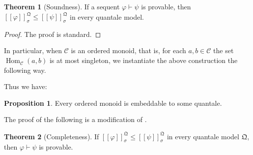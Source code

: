 \documentclass[8pt]{article}
\theoremstyle{definition}
\theoremstyle{definition}
\newtheorem{theorem}{Theorem}[section]
\theoremstyle{definition}
\theoremstyle{definition}
\theoremstyle{definition}
\theoremstyle{definition}
\theoremstyle{definition}
\newtheorem{prop}{Proposition}[section]
\theoremstyle{definition}
\theoremstyle{definition}
\theoremstyle{definition}
\theoremstyle{definition}
\theoremstyle{definition}
\theoremstyle{definition}
\theoremstyle{question}
\begin{document}
\begin{theorem}[Soundness]
  If a sequent $\varphi \vdash \psi$ is provable, then $[\![\varphi]\!]^{\mathfrak{Q}}_{\sigma} \leq [\![\psi]\!]^{\mathfrak{Q}}_{\sigma}$
  in every quantale model.
\end{theorem}

\begin{proof} The proof is standard.
\end{proof}


In particular, when $\mathcal{C}$ is an ordered monoid, that is, for each $a, b \in \mathcal{C}$
the set $\operatorname{Hom}_{\mathcal{C}}(a, b)$ is at most singleton, we instantiate the above construction the following way.

Thus we have:
\begin{prop}
  Every ordered monoid is embeddable to some quantale.
\end{prop}

The proof of the following is a modification of \cite[Theorem 4]{goldblatt2006kripke}.

\begin{theorem}[Completeness]
  If $[\![\varphi]\!]^{\mathfrak{Q}}_{\sigma} \leq [\![\psi]\!]^{\mathfrak{Q}}_{\sigma}$
  in every quantale model $\mathfrak{Q}$, then $\varphi \vdash \psi$ is provable.
\end{theorem}
\end{document}
